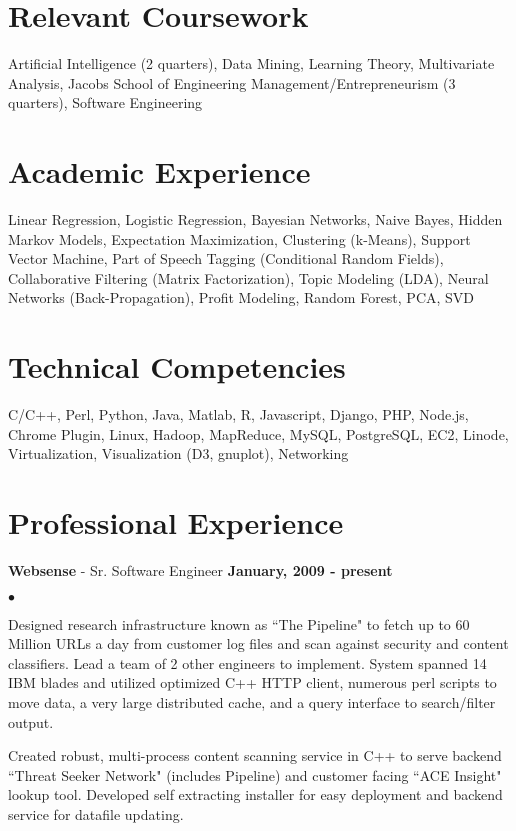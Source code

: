 \documentclass[margin,line]{res}
\newenvironment{list2}{
  \begin{list}{$\bullet$}{%
      \setlength{\itemsep}{0in}
      \setlength{\parsep}{0in} \setlength{\parskip}{0in}
      \setlength{\topsep}{0in} \setlength{\partopsep}{0in} 
      \setlength{\leftmargin}{0.2in}}}{\end{list}}
\begin{document}
\begin{resume}
\section{\sc Relevant Coursework} 
Artificial Intelligence (2 quarters), Data Mining, Learning Theory, 
Multivariate Analysis, Jacobs School of Engineering Management/Entrepreneurism (3 quarters), Software Engineering

\section{\sc Academic Experience}
Linear Regression, Logistic Regression, Bayesian Networks, Naive Bayes, Hidden Markov Models, Expectation Maximization, Clustering (k-Means), Support Vector Machine, Part of Speech Tagging (Conditional Random Fields), Collaborative Filtering (Matrix Factorization), Topic Modeling (LDA), Neural Networks (Back-Propagation), Profit Modeling, Random Forest, PCA, SVD

\section{\sc Technical Competencies} 
C/C++, Perl, Python, Java, Matlab, R, Javascript, Django, PHP, Node.js, Chrome Plugin, Linux, Hadoop, MapReduce, MySQL, PostgreSQL, EC2, Linode, Virtualization, Visualization (D3, gnuplot), Networking

\section{\sc Professional Experience}

{\bf Websense} - Sr. Software Engineer \hfill {\bf January, 2009 - present} \\

\begin{list2}
\item Designed research infrastructure known as ``The Pipeline" to fetch up to 60 Million URLs a day from customer log files and scan against security and content classifiers.  Lead a team of 2 other engineers to implement.  System spanned 14 IBM blades and utilized optimized C++ HTTP client, numerous perl scripts to move data, a very large distributed cache, and a query interface to search/filter output.

\item Created robust, multi-process content scanning service in C++ to serve backend ``Threat Seeker Network" (includes Pipeline) and customer facing ``ACE Insight" lookup tool.  Developed self extracting installer for easy deployment and backend service for datafile updating.


\end{list2}
\end{resume}
\end{document}
